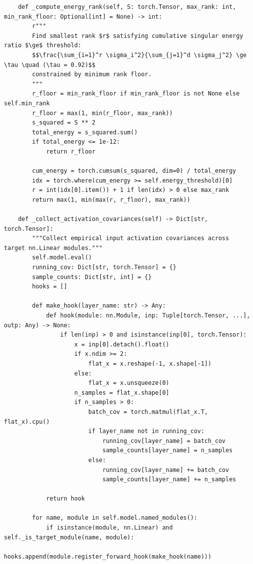 \begin{lstlisting}
    def _compute_energy_rank(self, S: torch.Tensor, max_rank: int, min_rank_floor: Optional[int] = None) -> int:
        r"""
        Find smallest rank $r$ satisfying cumulative singular energy ratio $\ge$ threshold:
        $$\frac{\sum_{i=1}^r \sigma_i^2}{\sum_{j=1}^d \sigma_j^2} \ge \tau \quad (\tau = 0.92)$$
        constrained by minimum rank floor.
        """
        r_floor = min_rank_floor if min_rank_floor is not None else self.min_rank
        r_floor = max(1, min(r_floor, max_rank))
        s_squared = S ** 2
        total_energy = s_squared.sum()
        if total_energy <= 1e-12:
            return r_floor

        cum_energy = torch.cumsum(s_squared, dim=0) / total_energy
        idx = torch.where(cum_energy >= self.energy_threshold)[0]
        r = int(idx[0].item()) + 1 if len(idx) > 0 else max_rank
        return max(1, min(max(r, r_floor), max_rank))

    def _collect_activation_covariances(self) -> Dict[str, torch.Tensor]:
        """Collect empirical input activation covariances across target nn.Linear modules."""
        self.model.eval()
        running_cov: Dict[str, torch.Tensor] = {}
        sample_counts: Dict[str, int] = {}
        hooks = []

        def make_hook(layer_name: str) -> Any:
            def hook(module: nn.Module, inp: Tuple[torch.Tensor, ...], outp: Any) -> None:
                if len(inp) > 0 and isinstance(inp[0], torch.Tensor):
                    x = inp[0].detach().float()
                    if x.ndim >= 2:
                        flat_x = x.reshape(-1, x.shape[-1])
                    else:
                        flat_x = x.unsqueeze(0)
                    n_samples = flat_x.shape[0]
                    if n_samples > 0:
                        batch_cov = torch.matmul(flat_x.T, flat_x).cpu()
                        if layer_name not in running_cov:
                            running_cov[layer_name] = batch_cov
                            sample_counts[layer_name] = n_samples
                        else:
                            running_cov[layer_name] += batch_cov
                            sample_counts[layer_name] += n_samples

            return hook

        for name, module in self.model.named_modules():
            if isinstance(module, nn.Linear) and self._is_target_module(name, module):
                hooks.append(module.register_forward_hook(make_hook(name)))


\end{lstlisting}
